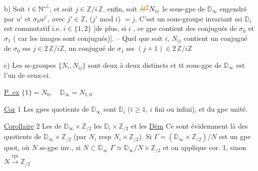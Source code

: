 b) 
Soit $i\in\mathbb N^{\deleted{\unsure{*}}}$, et soit $j\in\mathbb Z/i\,\mathbb Z$. 
enfin, soit $\deleted{\unsure{H}}N_{ij}$ le sous-gpe de $\mathbb D_\infty$ engendré par
$u^i$ et $\sigma_0u^{j'}$, avec $j'\in\mathbb Z$, ($j'$ mod $i$) $=j$. C'est un sous-groupe
 invariant ssi $\mathbb D_i$ est commutatif i.e. $i\in\{1,2\}$ 
 
[de plus, si $i$ , ce gpe contient des conjugués de $\sigma_0$ et $\sigma_1$ ( car les images sont conjugués)]. --
 Quel que soit $i$, $N_{ij}$ contient un conjugué
de $\sigma_0$ sss $j\in2\,\mathbb Z/i\mathbb Z$, un conjugué de $\sigma_1$ sss $(j+1)\in2\,\mathbb Z/i\mathbb Z$

c) Les ss-groupes $\{N_i,N_{ij}\}$ sont deux à deux distincts
et tt sous-gpe de $\mathbb D_\infty$ est l'un de ceux-ci.

\uline{P. ex} $\{1\}=N_0,\quad\mathbb D_\infty=N_{1,0}$

\uline{Cor} 1 Les  gpes quotients de $\mathbb D_\infty$ sont  $\mathbb D_i$ ($i\geq1$, $i$
fini ou infini), \deleted{\unsure{$+$}} et  du gpe unité.

\uline{Corollaire} 2 Les 
de $\mathbb D_\infty\times\mathbb Z_{/2}$  les $\mathbb D_i\times\mathbb Z_{/2}$  et les 
 \uline{Dém} Ce sont évidemment là des quotients de
$\mathbb D_\infty\times\mathbb Z_{/2}$ (par $N_i$ resp $N_i\times\mathbb Z_{/2}$). Si $\Gamma=(\mathbb D_\infty\times\mathbb Z_{/2})/N$
est un gpe quot, où $N$ ss-gpe inv., si $N\subset\mathbb D_\infty$
$\Gamma\simeq\mathbb D_\infty/N\times\mathbb Z_{/2}$ et on applique cor. 1, sinon $N\xrightarrow{\text{épi}}\mathbb Z_{/2}$
